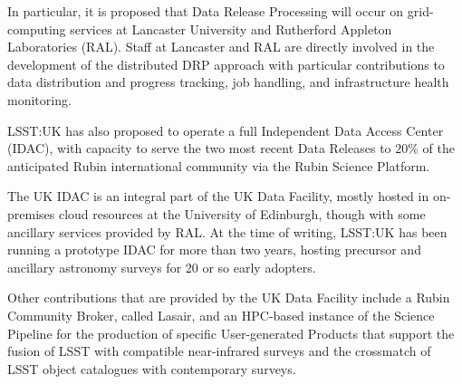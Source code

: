 In particular, it is proposed that Data Release Processing will occur on grid-computing services at Lancaster University and Rutherford Appleton Laboratories (RAL). Staff at Lancaster and RAL are directly involved in the development of the distributed DRP approach with particular contributions to data distribution and progress tracking, job handling, and infrastructure health monitoring.

LSST:UK has also proposed to operate a full Independent Data Access Center (IDAC), with capacity to serve the two most recent Data Releases to $20\%$ of the anticipated Rubin international community via the Rubin Science Platform.

The UK IDAC is an integral part of the UK Data Facility, mostly hosted in on-premises cloud resources at the University of Edinburgh, though with some ancillary services provided by RAL. At the time of writing, LSST:UK has been running a prototype IDAC for more than two years, hosting precursor and ancillary astronomy surveys for 20 or so early adopters.

Other contributions that are provided by the UK Data Facility include a Rubin Community Broker, called Lasair, and an HPC-based instance of the Science Pipeline for the production of specific User-generated Products that support the fusion of LSST with compatible near-infrared surveys and the crossmatch of LSST object catalogues with contemporary surveys.

